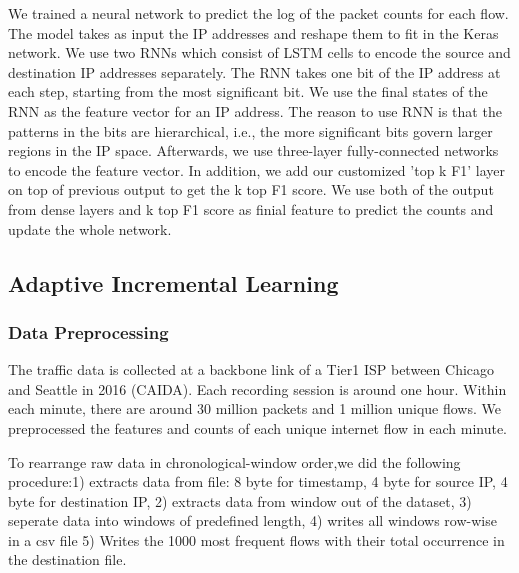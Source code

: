 We trained a neural network to predict the log of the packet counts for each flow. The model takes as input the IP addresses and reshape them to fit in the Keras network. We use two RNNs which consist of LSTM cells to encode the source and destination IP addresses separately. The RNN takes one bit of the IP address at each step, starting from the most significant bit. We use the final states of the RNN as the feature vector for an IP address. The reason to use RNN is that the patterns in the bits are hierarchical, i.e., the more significant bits govern larger regions in the IP space. Afterwards, we use three-layer fully-connected networks to encode the feature vector. In addition, we add our customized 'top k F1' layer on top of previous output to get the k top F1 score. We use both of the output from dense layers and k top F1 score as finial feature to predict the counts and update the whole network.


\subsection{Adaptive Incremental Learning}

\subsubsection{Data Preprocessing}

% 



The traffic data is collected at a backbone link of a Tier1 ISP between Chicago and Seattle in 2016 (CAIDA). Each recording session is around one hour. Within each minute, there are around 30 million packets and 1 million unique flows. We preprocessed the features and counts of each unique internet flow in each minute.

To rearrange raw data in chronological-window order,we did the following procedure:1) extracts data from file: 8 byte for timestamp, 4 byte for source IP, 4 byte for destination IP,
2) extracts data from window out of the dataset, 3) seperate data into windows of predefined length, 4) writes all windows row-wise in a csv file 5) Writes the 1000 most frequent flows with their total occurrence in the destination file.

